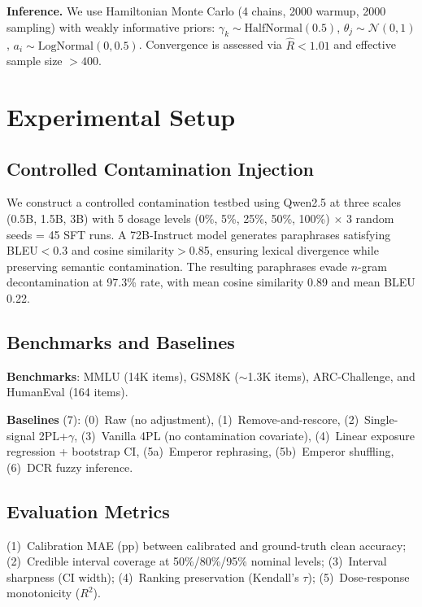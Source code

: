 \documentclass[letterpaper]{article}
\begin{document}
\textbf{Inference.}
We use Hamiltonian Monte Carlo (4 chains, 2000 warmup, 2000 sampling) with weakly informative priors: $\gamma_k \sim \text{HalfNormal}(0.5)$, $\theta_j \sim \mathcal{N}(0,1)$, $a_i \sim \text{LogNormal}(0,0.5)$.
Convergence is assessed via $\hat{R} < 1.01$ and effective sample size $> 400$.

\section{Experimental Setup}
\label{sec:setup}

\subsection{Controlled Contamination Injection}
\label{sec:injection}

We construct a controlled contamination testbed using Qwen2.5 at three scales (0.5B, 1.5B, 3B) with 5 dosage levels (0\%, 5\%, 25\%, 50\%, 100\%) $\times$ 3 random seeds = 45 SFT runs.
A 72B-Instruct model generates paraphrases satisfying BLEU$<$0.3 and cosine similarity$>$0.85, ensuring lexical divergence while preserving semantic contamination.
The resulting paraphrases evade $n$-gram decontamination at 97.3\% rate, with mean cosine similarity 0.89 and mean BLEU 0.22.

\subsection{Benchmarks and Baselines}

\textbf{Benchmarks}: MMLU (14K items), GSM8K ($\sim$1.3K items), ARC-Challenge, and HumanEval (164 items).

\textbf{Baselines} (7): (0)~Raw (no adjustment), (1)~Remove-and-rescore, (2)~Single-signal 2PL+$\gamma$, (3)~Vanilla 4PL (no contamination covariate), (4)~Linear exposure regression + bootstrap CI, (5a)~Emperor rephrasing, (5b)~Emperor shuffling, (6)~DCR fuzzy inference.

\subsection{Evaluation Metrics}
(1)~Calibration MAE (pp) between calibrated and ground-truth clean accuracy;
(2)~Credible interval coverage at 50\%/80\%/95\% nominal levels;
(3)~Interval sharpness (CI width);
(4)~Ranking preservation (Kendall's $\tau$);
(5)~Dose-response monotonicity ($R^2$).
\end{document}
